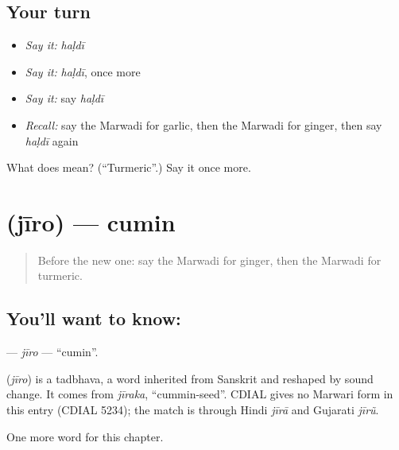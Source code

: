 \subsection*{Your turn}
\begin{itemize}
\raggedright
  \item \emph{Say it:} \emph{haḷdī}
  \item \emph{Say it:} \emph{haḷdī}, once more
  \item \emph{Say it:} say \emph{haḷdī}
  \item \emph{Recall:} say the Marwadi for garlic, then the Marwadi for ginger, then say \emph{haḷdī} again
\end{itemize}

\begin{tcolorbox}[breakable,colback=teal!4,colframe=teal!35!black,title={Before you move on}]
What does  mean? (\textquotedblleft{}Turmeric\textquotedblright{}.) Say it once more.
\end{tcolorbox}
\section[\texorpdfstring{\mw{जीरो} (jīro)}{जीरो (jīro)}]{ (jīro) — cumin}

\label{lesson:MW-C136-jiro}



\begin{quote}
Before the new one: say the Marwadi for ginger, then the Marwadi for turmeric.
\end{quote}

\subsection*{You'll want to know: }
\textbf{} — \emph{jīro} — \textquotedblleft{}cumin\textquotedblright{}.

\begin{cousinweb}
\textbf{} (\emph{jīro}) is a tadbhava, a word inherited from Sanskrit and reshaped by sound change. It comes from \emph{jīraka}, \textquotedblleft{}cummin-seed\textquotedblright{}. CDIAL gives no Marwari form in this entry (CDIAL 5234); the match is through Hindi \emph{jīrā} and Gujarati \emph{jīrũ}.
\end{cousinweb}

\begin{grammarlens}[title={What you've built}]
One more word for this chapter.
\end{grammarlens}

